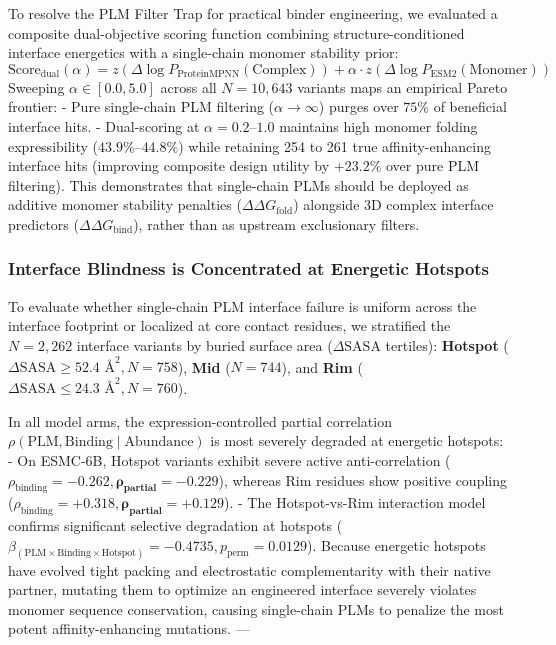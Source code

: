 \documentclass[
  11pt,
  us-letterpaper,
  DIV=11,
  numbers=noendperiod]{scrartcl}
\begin{document}
To resolve the PLM Filter Trap for practical binder engineering, we
evaluated a composite dual-objective scoring function combining
structure-conditioned interface energetics with a single-chain monomer
stability prior:
\[\text{Score}_{\text{dual}}(\alpha) = z(\Delta\log P_{\text{ProteinMPNN}}(\text{Complex})) + \alpha \cdot z(\Delta\log P_{\text{ESM2}}(\text{Monomer}))\]
Sweeping \(\alpha \in [0.0, 5.0]\) across all \(N = 10,643\) variants
maps an empirical Pareto frontier: - Pure single-chain PLM filtering
(\(\alpha \to \infty\)) purges over \(75\%\) of beneficial interface
hits. - Dual-scoring at \(\alpha = 0.2\text{--}1.0\) maintains high
monomer folding expressibility (\(43.9\%\text{--}44.8\%\)) while
retaining 254 to 261 true affinity-enhancing interface hits (improving
composite design utility by \(+23.2\%\) over pure PLM filtering). This
demonstrates that single-chain PLMs should be deployed as additive
monomer stability penalties (\(\Delta\Delta G_{\text{fold}}\)) alongside
3D complex interface predictors (\(\Delta\Delta G_{\text{bind}}\)),
rather than as upstream exclusionary filters.

\subsubsection{Interface Blindness is Concentrated at Energetic
Hotspots}\label{interface-blindness-is-concentrated-at-energetic-hotspots}

To evaluate whether single-chain PLM interface failure is uniform across
the interface footprint or localized at core contact residues, we
stratified the \(N = 2,262\) interface variants by buried surface area
(\(\Delta\text{SASA}\) tertiles): \textbf{Hotspot}
(\(\Delta\text{SASA} \ge 52.4\text{ \AA}^2, N = 758\)), \textbf{Mid}
(\(N = 744\)), and \textbf{Rim}
(\(\Delta\text{SASA} \le 24.3\text{ \AA}^2, N = 760\)).

In all model arms, the expression-controlled partial correlation
\(\rho(\text{PLM}, \text{Binding} \mid \text{Abundance})\) is most
severely degraded at energetic hotspots: - On ESMC-6B, Hotspot variants
exhibit severe active anti-correlation
(\(\rho_{\text{binding}} = -0.262, \mathbf{\rho_{\text{partial}} = -0.229}\)),
whereas Rim residues show positive coupling
(\(\rho_{\text{binding}} = +0.318, \mathbf{\rho_{\text{partial}} = +0.129}\)).
- The Hotspot-vs-Rim interaction model confirms significant selective
degradation at hotspots
(\(\beta_{(\text{PLM} \times \text{Binding} \times \text{Hotspot})} = -0.4735, p_{\text{perm}} = 0.0129\)).
Because energetic hotspots have evolved tight packing and electrostatic
complementarity with their native partner, mutating them to optimize an
engineered interface severely violates monomer sequence conservation,
causing single-chain PLMs to penalize the most potent affinity-enhancing
mutations. ---
\end{document}
